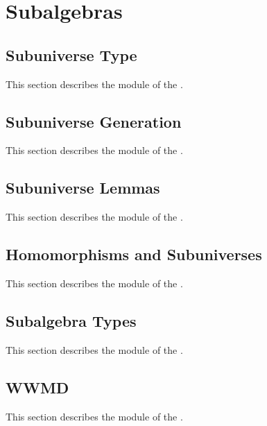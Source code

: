 \documentclass[a4paper,UKenglish,cleveref, autoref, thm-restate]{lipics-v2021}
\begin{document}
\newpage

\section{Subalgebras}\label{sec:subalgebras}

\subsection{Subuniverse Type}\label{sec:subuniverse-type}
This section describes the \ualibSubuniverses module of the \agdaualib.


\subsection{Subuniverse Generation}\label{sec:subun-gener}
This section describes the \ualibGeneration module of  the \agdaualib.


\subsection{Subuniverse Lemmas}\label{sec:subuniverse-lemmas}
This section describes the \ualibProperties module of  the \agdaualib.


\subsection{Homomorphisms and Subuniverses}\label{homomorphisms-and-subuniverses}
This section describes the \ualibHomsAndSubs module of  the \agdaualib.


\subsection{Subalgebra Types}\label{sec:subalgebra-types}
This section describes the \ualibSubalgebras module of  the \agdaualib.


\subsection{WWMD}\label{sec:wwmd}
This section describes the \ualibWWMD module of  the \agdaualib.


\newpage
\end{document}
